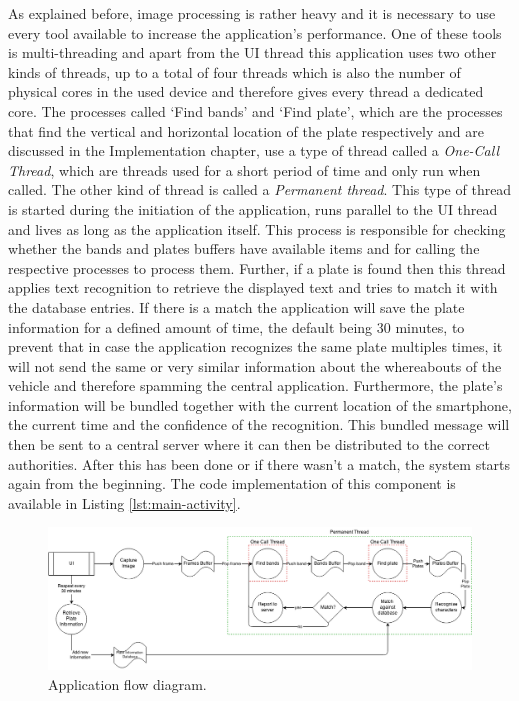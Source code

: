 As explained before, image processing is rather heavy and it is necessary to use every tool available to increase the application's performance. One of these tools is multi-threading and apart from the UI thread this application uses two other kinds of threads, up to a total of four threads which is also the number of physical cores in the used device and therefore gives every thread a dedicated core. The processes called `Find bands' and `Find plate', which are the processes that find the vertical and horizontal location of the plate respectively and are discussed in the Implementation chapter, use a type of thread called a \emph{One-Call Thread}, which are threads used for a short period of time and only run when called. The other kind of thread is called a \emph{Permanent thread}. This type of thread is started during the initiation of the application, runs parallel to the UI thread and lives as long as the application itself. This process is responsible for checking whether the bands and plates buffers have available items and for calling the respective processes to process them. Further, if a plate is found then this thread applies text recognition to retrieve the displayed text and tries to match it with the database entries. If there is a match the application will save the plate information for a defined amount of time, the default being 30 minutes, to prevent that in case the application recognizes the same plate multiples times, it will not send the same or very similar information about the whereabouts of the vehicle and therefore spamming the central application. Furthermore, the plate's information will be bundled together with the current location of the smartphone, the current time and the confidence of the recognition. This bundled message will then be sent to a central server where it can then be distributed to the correct authorities. After this has been done or if there wasn't a match, the system starts again from the beginning. The code implementation of this component is available in Listing \ref{lst:main-activity}.


\begin{figure}[ht]
    \centering
    \includegraphics[width=\textwidth]{plaatjes/architecture-RoadEye-parallel}
    \caption{Application flow diagram.}
    \label{fig:architecture}
\end{figure}%

